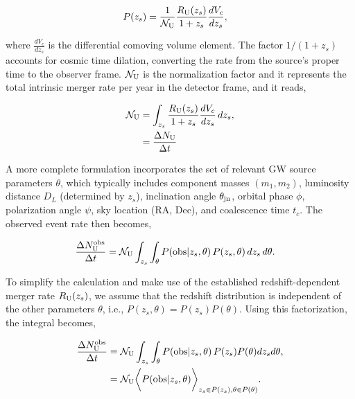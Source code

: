 \documentclass[aps,prd,twocolumn,superscriptaddress,groupedaddress,nofootinbib,showpacs,eqsecnum]{revtex4-1}
\begin{document}
\begin{align}
P(z_s) &= \frac{1}{{\cal N}_{\rm U}} \frac{R_{\rm U}(z_s)}{1+z_s} \frac{dV_c}{dz_s},
\label{eqn:unlensed_event_rate_z_2}
\end{align}

where $\frac{dV_c}{dz_s}$ is the differential comoving volume element. The factor $1/(1+z_s)$ accounts for cosmic time dilation, converting the rate from the source's proper time to the observer frame. ${\cal N}_{\rm U}$ is the normalization factor and it represents the total intrinsic merger rate per year in the detector frame, and it reads,

\begin{align}
{\cal N}_{\rm U} &= \int_{z_s} \frac{R_{\rm U}(z_s)}{1+z_s} \frac{dV_c}{dz_s} \, dz_s, \\
&= \frac{\Delta N_{\rm U}}{\Delta t}
\label{eqn:unlensed_event_rate_N_U_definition}
\end{align}


A more complete formulation incorporates the set of relevant GW source parameters $\theta$, which typically includes component masses $(m_1, m_2)$, luminosity distance $D_L$ (determined by $z_s$), inclination angle $\theta_{\rm jn}$, orbital phase $\phi$, polarization angle $\psi$, sky location (RA, Dec), and coalescence time $t_c$. The observed event rate then becomes,

\begin{align}
\frac{\Delta N^{\rm obs}_{\rm U}}{\Delta t} &= {\cal N}_{\rm U} \int_{z_s} \int_{\theta} P({\rm obs}|z_s, \theta) \, P(z_s, \theta) \, dz_s \, d\theta.
\end{align}

To simplify the calculation and make use of the established redshift-dependent merger rate $R_{\rm U}(z_s)$, we assume that the redshift distribution is independent of the other parameters $\theta$, i.e., $P(z_s, \theta) = P(z_s) P(\theta)$. Using this factorization, the integral becomes,

\begin{align}
\frac{\Delta N^{\rm obs}_{\rm U}}{\Delta t} &= {\cal N}_{\rm U} \int_{z_s} \int_{\theta} P({\rm obs}|z_s, \theta)\, P(z_s) P(\theta) dz_s d\theta, \\
&= {\cal N}_{\rm U} \bigg\langle P({\rm obs}|z_s, \theta) \bigg\rangle_{z_s \in P(z_s), \theta \in P(\theta)}. \label{eqn:unlensed_event_rate_z_4}
\end{align}
\end{document}
